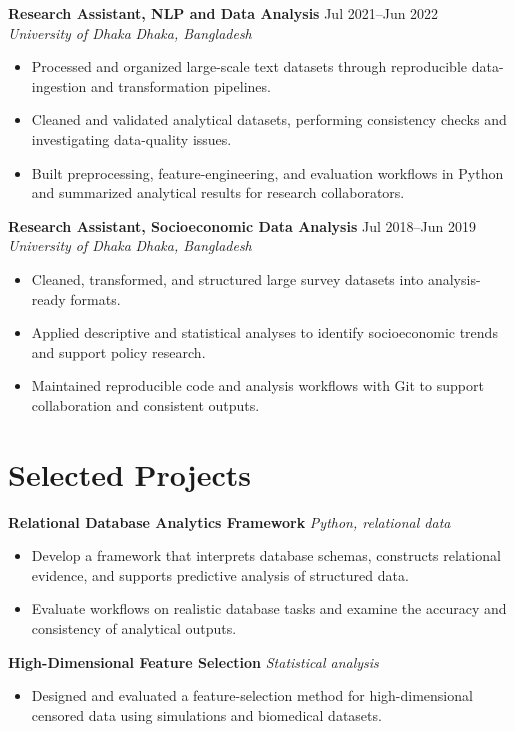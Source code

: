 \documentclass[10pt,letterpaper]{article}
\newcommand{\role}[4]{%
  \textbf{#1} \hfill #2\\
  \textit{#3} \hfill \textit{#4}
}
\begin{document}
\role{Research Assistant, NLP and Data Analysis}{Jul 2021--Jun 2022}{University of Dhaka}{Dhaka, Bangladesh}
\begin{itemize}
  \item Processed and organized large-scale text datasets through reproducible data-ingestion and transformation pipelines.
  \item Cleaned and validated analytical datasets, performing consistency checks and investigating data-quality issues.
  \item Built preprocessing, feature-engineering, and evaluation workflows in Python and summarized analytical results for research collaborators.
\end{itemize}

\role{Research Assistant, Socioeconomic Data Analysis}{Jul 2018--Jun 2019}{University of Dhaka}{Dhaka, Bangladesh}
\begin{itemize}
  \item Cleaned, transformed, and structured large survey datasets into analysis-ready formats.
  \item Applied descriptive and statistical analyses to identify socioeconomic trends and support policy research.
  \item Maintained reproducible code and analysis workflows with Git to support collaboration and consistent outputs.
\end{itemize}

\section{Selected Projects}
\textbf{Relational Database Analytics Framework} \hfill \textit{Python, relational data}
\begin{itemize}
  \item Develop a framework that interprets database schemas, constructs relational evidence, and supports predictive analysis of structured data.
  \item Evaluate workflows on realistic database tasks and examine the accuracy and consistency of analytical outputs.
\end{itemize}

\textbf{High-Dimensional Feature Selection} \hfill \textit{Statistical analysis}
\begin{itemize}
  \item Designed and evaluated a feature-selection method for high-dimensional censored data using simulations and biomedical datasets.
\end{itemize}
\end{document}
